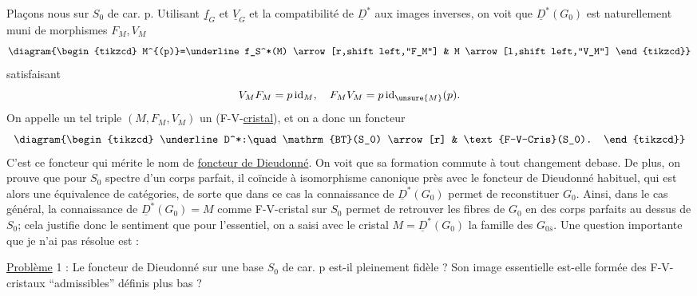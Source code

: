  Plaçons nous sur $S_0$ de car. p. Utilisant $\underline f_G$ et $\underline V_G$ et la compatibilité de $\underline D^*$ aux images inverses, on voit que 
$\underline D^*(G_0)$  est naturellement muni de morphismes $F_M,V_M$ 
\[
\diagram{\begin{tikzcd}
M^{(p)}=\underline f_S^*(M) \arrow[r,shift left,"F_M"] & M \arrow[l,shift left,"V_M"]
\end{tikzcd}}
\]
satisfaisant
\[
V_MF_M=p\operatorname{id}_M,\quad F_MV_M=p\operatorname{id}_{\unsure{M}}(p).
\]
On appelle un tel triple $(M,F_M,V_M)$ un (F-V-\uline{cristal}), et on a donc un foncteur
\[
\diagram{\begin{tikzcd}
\underline D^*:\quad\mathrm{BT}(S_0) \arrow[r] & \text{F-V-Cris}(S_0).
\end{tikzcd}}
\]
C'est ce foncteur qui mérite le nom de \uline{foncteur de Dieudonné}. On   voit que sa formation commute à tout changement de\inserted{ }base. De plus, on prouve que pour $S_0$ spectre d'un corps parfait, il coïncide  à isomorphisme canonique près avec le foncteur de Dieudonné habituel, qui est alors une équivalence de catégories, de sorte que dans ce cas la
connaissance de $\underline D^*(G_0)$ permet de reconstituer $G_0$. Ainsi, dans le cas général, la connaissance de $\underline D^*(G_0)=M$ comme F-V-cristal sur $S_0$ permet de retrouver les fibres de $G_0$ en des corps parfaits au dessus de $S_0$; cela justifie donc le sentiment que pour l'essentiel, on a saisi avec le cristal $M=\underline D^*(G_0)$ la famille des $G_{0\bar s}$. Une question importante  que je n'ai pas résolue est :

\uline{Problème} 1 : Le foncteur de Dieudonné sur une base $S_0$ de car. p est-il pleinement fidèle ?  Son image essentielle est-elle formée des F-V-cristaux ``admissibles'' définis plus bas ?

